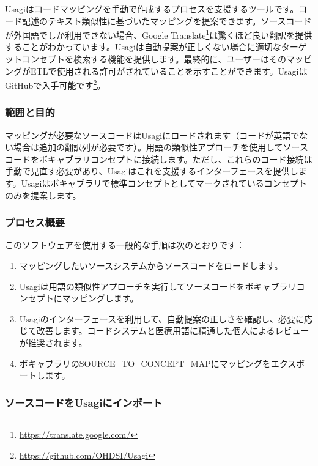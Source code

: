 \documentclass[
  11pt]{book}
\providecommand{\tightlist}{%
  \setlength{\itemsep}{0pt}\setlength{\parskip}{0pt}}
\theoremstyle{definition}
\theoremstyle{definition}
\theoremstyle{definition}
\theoremstyle{definition}
\theoremstyle{remark}
\begin{document}
Usagiはコードマッピングを手動で作成するプロセスを支援するツールです。コード記述のテキスト類似性に基づいたマッピングを提案できます。ソースコードが外国語でしか利用できない場合、Google Translate\footnote{\url{https://translate.google.com/}}は驚くほど良い翻訳を提供することがわかっています。Usagiは自動提案が正しくない場合に適切なターゲットコンセプトを検索する機能を提供します。最終的に、ユーザーはそのマッピングがETLで使用される許可がされていることを示すことができます。UsagiはGitHubで入手可能です\footnote{\url{https://github.com/OHDSI/Usagi}}。  

\subsubsection*{範囲と目的}\label{ux7bc4ux56f2ux3068ux76eeux7684-2}

マッピングが必要なソースコードはUsagiにロードされます（コードが英語でない場合は追加の翻訳列が必要です）。用語の類似性アプローチを使用してソースコードをボキャブラリコンセプトに接続します。ただし、これらのコード接続は手動で見直す必要があり、Usagiはこれを支援するインターフェースを提供します。Usagiはボキャブラリで標準コンセプトとしてマークされているコンセプトのみを提案します。

\subsubsection*{プロセス概要}\label{ux30d7ux30edux30bbux30b9ux6982ux8981-2}

このソフトウェアを使用する一般的な手順は次のとおりです：

\begin{enumerate}
\def\labelenumi{\arabic{enumi}.}
\tightlist
\item
  マッピングしたいソースシステムからソースコードをロードします。
\item
  Usagiは用語の類似性アプローチを実行してソースコードをボキャブラリコンセプトにマッピングします。
\item
  Usagiのインターフェースを利用して、自動提案の正しさを確認し、必要に応じて改善します。コードシステムと医療用語に精通した個人によるレビューが推奨されます。
\item
  ボキャブラリのSOURCE\_TO\_CONCEPT\_MAPにマッピングをエクスポートします。
\end{enumerate}

\subsubsection*{ソースコードをUsagiにインポート}\label{ux30bdux30fcux30b9ux30b3ux30fcux30c9ux3092usagiux306bux30a4ux30f3ux30ddux30fcux30c8}
\end{document}
